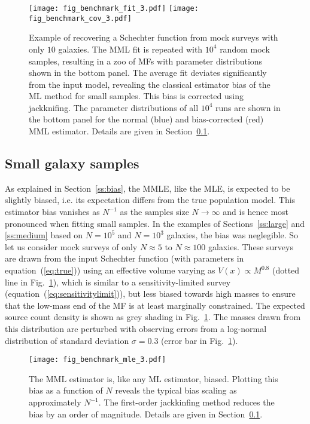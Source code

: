\documentclass[a4paper,fleqn,usenatbib]{mnras}
\newcommand{\veff}{V}%
\newcommand{\fig}[1]{Fig.~\ref{fig:#1}}
\newcommand{\eq}[1]{equation~(\ref{eq:#1})}
\renewcommand{\ss}[1]{Section~\ref{ss:#1}}
\newcommand{\ie}{i.e.\xspace}
\begin{document}
\begin{figure}
\begin{center}
\texttt{[image: fig\_benchmark\_fit\_3.pdf]}\vspace{0.1cm}
\texttt{[image: fig\_benchmark\_cov\_3.pdf]}\vspace{0.0cm}
\caption{Example of recovering a Schechter function from mock surveys with only $10$ galaxies. The MML fit is repeated with $10^4$ random mock samples, resulting in a zoo of MFs with parameter distributions shown in the bottom panel. The average fit deviates significantly from the input model, revealing the classical estimator bias of the ML method for small samples. This bias is corrected using jackknifing. The parameter distributions of all $10^4$ runs are shown in the bottom panel for the normal (blue) and bias-corrected (red) MML estimator. Details are given in \ss{small}.}\label{fig:small}
\end{center}
\end{figure}

\subsection{Small galaxy samples}\label{ss:small}

As explained in \ss{bias}, the MMLE, like the MLE, is expected to be slightly biased, \ie its expectation differs from the true population model. This estimator bias vanishes as $N^{-1}$ as the samples size $N\rightarrow\infty$ \citep{Kendall1979} and is hence most pronounced when fitting small samples. In the examples of Sections~\ref{ss:large} and \ref{ss:medium} based on $N=10^5$ and $N=10^3$ galaxies, the bias was neglegible. So let us consider mock surveys of only $N\approx5$ to $N\approx100$ galaxies. These surveys are drawn from the input Schechter function (with parameters in \eq{true}) using an effective volume varying as $\veff(x)\propto M^{0.8}$ (dotted line in \fig{small}), which is similar to a sensitivity-limited survey (\eq{sensitivitylimit}), but less biased towards high masses to ensure that the low-mass end of the MF is at least marginally constrained. The expected source count density is shown as grey shading in \fig{small}. The masses drawn from this distribution are perturbed with observing errors from a log-normal distribution of standard deviation $\sigma=0.3$ (error bar in \fig{small}).

\begin{figure}
\begin{center}
\texttt{[image: fig\_benchmark\_mle\_3.pdf]}
\caption{The MML estimator is, like any ML estimator, biased. Plotting this bias as a function of $N$ reveals the typical bias scaling as approximately $N^{-1}$. The first-order jackkinfing method reduces the bias by an order of magnitude. Details are given in \ss{small}.}\label{fig:small_trend}
\end{center}
\end{figure}
\end{document}
